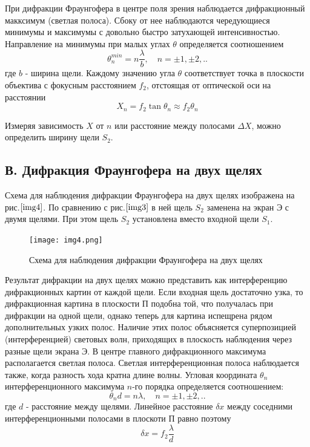 \documentclass[a4paper,12pt]{article}
\begin{document}
При дифракции Фраунгофера в центре поля зрения наблюдается дифракционный макксимум (светлая полоса). Сбоку от нее наблюдаются чередующиеся минимумы и максимумы с довольно быстро затухающей интенсивностью. Направление на минимумы при малых углах $\theta$ определяется соотношением 
\begin{equation}
    \theta_n^{min} = n\frac{\lambda}{b}, \quad n=\pm1, \pm2,..
\end{equation}
где $b$ - ширина щели. Каждому значению угла $\theta$ соответствует точка в плоскости объектива с фокусным расстоянием $f_2$, отстоящая от оптической оси на расстоянии 
\begin{equation}
    X_n=f_2\tan{\theta_n} \approx f_2\theta_n
\end{equation}

Измеряя зависимость $X$ от $n$ или расстояние между полосами $\Delta X$, можно определить ширину щели $S_2$.

\subsection{В. Дифракция Фраунгофера на двух щелях}
Схема для наблюдения дифракции Фраунгофера на двух щелях изображена на рис.$\ref{img4}$. По сравнению с рис.$\ref{img3}$ в ней щель $S_2$ заменена на экран Э с двумя щелями. При этом щель $S_2$ установлена вместо входной щели $S_1$.

\begin{figure}[h]
\centering
\texttt{[image: img4.png]}
\caption{Схема для наблюдения дифракции Фраунгофера на двух щелях}
\label{img4}
\end{figure}

Результат дифракции на двух щелях можно представить как интерференцию дифракционных картин от каждой щели. Если входная щель достаточно узка, то дифракционная картина в плоскости П подобна той, что получалась при дифракции на одной щели, однако теперь для картина испещрена рядом дополнительных узких полос. Наличие этих полос объясняется суперпозицией (интерференцией) световых волн, приходящих в плоскость наблюдения через разные щели экрана Э. В центре главного дифракционного максимума располагается светлая полоса. Светлая интерференционная полоса наблюдается также, когда разность хода кратна длине волны. Угловая координата $\theta_n$ интерференционного максимума $n$-го порядка определяется соотношением:
\begin{equation}
    \theta_nd=n\lambda, \quad n=\pm1, \pm2,..
\end{equation}
где $d$ - расстояние между щелями. Линейное расстояние $\delta x$ между соседними интерференционными полосами в плоскоти П равно поэтому
\begin{equation}
    \delta x = f_2\frac{\lambda}{d}
\end{equation}
\end{document}
